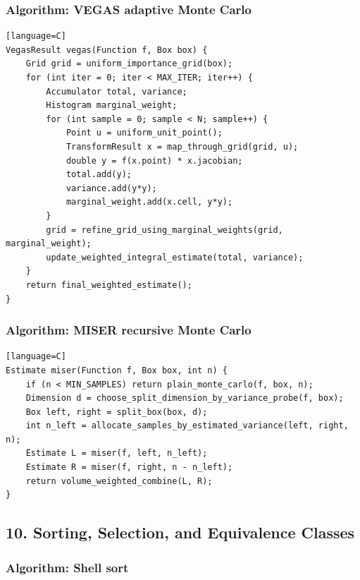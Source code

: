 \documentclass[11pt]{article}
\begin{document}
\subsubsection{Algorithm: VEGAS adaptive Monte Carlo}\label{algorithm-vegas-adaptive-monte-carlo}

\begin{verbatim}[language=C]
VegasResult vegas(Function f, Box box) {
    Grid grid = uniform_importance_grid(box);
    for (int iter = 0; iter < MAX_ITER; iter++) {
        Accumulator total, variance;
        Histogram marginal_weight;
        for (int sample = 0; sample < N; sample++) {
            Point u = uniform_unit_point();
            TransformResult x = map_through_grid(grid, u);
            double y = f(x.point) * x.jacobian;
            total.add(y);
            variance.add(y*y);
            marginal_weight.add(x.cell, y*y);
        }
        grid = refine_grid_using_marginal_weights(grid, marginal_weight);
        update_weighted_integral_estimate(total, variance);
    }
    return final_weighted_estimate();
}
\end{verbatim}

\subsubsection{Algorithm: MISER recursive Monte Carlo}\label{algorithm-miser-recursive-monte-carlo}

\begin{verbatim}[language=C]
Estimate miser(Function f, Box box, int n) {
    if (n < MIN_SAMPLES) return plain_monte_carlo(f, box, n);
    Dimension d = choose_split_dimension_by_variance_probe(f, box);
    Box left, right = split_box(box, d);
    int n_left = allocate_samples_by_estimated_variance(left, right, n);
    Estimate L = miser(f, left, n_left);
    Estimate R = miser(f, right, n - n_left);
    return volume_weighted_combine(L, R);
}
\end{verbatim}

\subsection{10. Sorting, Selection, and Equivalence Classes}\label{sorting-selection-and-equivalence-classes}

\subsubsection{Algorithm: Shell sort}\label{algorithm-shell-sort}
\end{document}
